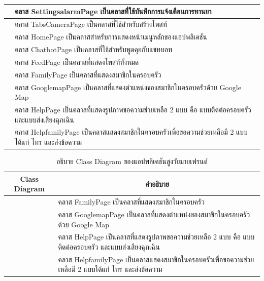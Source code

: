 \begin{table}[H]
\begin{tabular}{|c|p{10cm}|}
			& \setstretch{1.5} {คลาส SettingsalarmPage เป็นคลาสที่ใช้บันทึกการแจ้งเตือนการทานยา} \\ \hline
			\raisebox{-\totalheight}{TabsCameraPage}
			& \setstretch{1.5} {คลาส TabsCameraPage เป็นคลาสที่ใช้สำหรับสร้างโพสท์} \\ \hline
			\raisebox{-\totalheight}{HomePage}
			& \setstretch{1.5} {คลาส HomePage เป็นคลาสสำหรับการแสดงหน้าเมนูหลักของแอปพลิเคชัน} \\ \hline
			\raisebox{-\totalheight}{ChatbotPage}
			& \setstretch{1.5} {คลาส ChatbotPage เป็นคลาสที่ใช้สำหรับพูดคุยกับแชทบอท} \\ \hline
			\raisebox{-\totalheight}{FeedPage}
			& \setstretch{1.5} {คลาส FeedPage เป็นคลาสที่แสดงโพสท์ทั้งหมด} \\ \hline
			\raisebox{-\totalheight}{FamilyPage}
			& \setstretch{1.5} {คลาส FamilyPage เป็นคลาสที่แสดงสมาชิกในครอบครัว} \\ \hline
			\raisebox{-\totalheight}{GooglemapPage}
			& \setstretch{1.5} {คลาส GooglemapPage เป็นคลาสที่แสดงตำแหน่งของสมาชิกในครอบครัวด้วย Google Map} \\ \hline
			\raisebox{-\totalheight}{HelpPage}
			& \setstretch{1.5} {คลาส HelpPage เป็นคลาสที่แสดงรูปภาพขอความช่วยเหลือ 2 แบบ คือ แบบติดต่อครอบครัว และแบบส่งเสียงฉุกเฉิน} \\ \hline
			\raisebox{-\totalheight}{HelpfamilyPage}
			& \setstretch{1.5} {คลาส HelpfamilyPage เป็นคลาสแสดงสมาชิกในครอบครัวเพื่อขอความช่วยเหลือมี 2 แบบได้แก่ โทร และส่งข้อความ} \\ \hline
	\end{tabular}
\end{table}

\begin{table}[H]
	\centering
	\caption{อธิบาย Class Diagram ของแอปพลิเคชันสูงวัยมายเฟรนด์}
	\label{tab:class}
	\begin{tabular}{|c|p{10cm}|}
		\hline
		\textbf{Class Diagram} & \multicolumn{1}{c|}{\textbf{คำอธิบาย}} \\ \hline
		\raisebox{-\totalheight}{FamilyPage}
		& \setstretch{1.5} {คลาส FamilyPage เป็นคลาสที่แสดงสมาชิกในครอบครัว} \\ \hline
		\raisebox{-\totalheight}{GooglemapPage}
		& \setstretch{1.5} {คลาส GooglemapPage เป็นคลาสที่แสดงตำแหน่งของสมาชิกในครอบครัวด้วย Google Map} \\ \hline
		\raisebox{-\totalheight}{HelpPage}
		& \setstretch{1.5} {คลาส HelpPage เป็นคลาสที่แสดงรูปภาพขอความช่วยเหลือ 2 แบบ คือ แบบติดต่อครอบครัว และแบบส่งเสียงฉุกเฉิน} \\ \hline
		\raisebox{-\totalheight}{HelpfamilyPage}
		& \setstretch{1.5} {คลาส HelpfamilyPage เป็นคลาสแสดงสมาชิกในครอบครัวเพื่อขอความช่วยเหลือมี 2 แบบได้แก่ โทร และส่งข้อความ} \\ \hline
\end{tabular}
\end{table}

